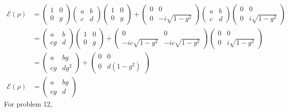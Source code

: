 \begin{align}
    \mathcal{E}(\rho) &= \begin{pmatrix}1 & 0 \\ 0 & g\end{pmatrix} \begin{pmatrix}a & b \\ c & d \end{pmatrix}\begin{pmatrix}1 & 0 \\ 0 & g\end{pmatrix} + \begin{pmatrix}0 & 0 \\ 0 & -i\sqrt{1-g^2}\end{pmatrix} \begin{pmatrix}a & b \\ c & d \end{pmatrix}\begin{pmatrix}0 & 0 \\ 0 & i\sqrt{1-g^2}\end{pmatrix} \\ 
    &= \begin{pmatrix}a & b \\ cg & d \end{pmatrix}\begin{pmatrix}1 & 0 \\ 0 & g\end{pmatrix} +  \begin{pmatrix}0 & 0 \\ -ic\sqrt{1-g^2} & -ic\sqrt{1-g^2}\end{pmatrix}\begin{pmatrix}0 & 0 \\ 0 & i\sqrt{1-g^2}\end{pmatrix}\\
    &= \begin{pmatrix}a & bg \\ cg & dg^2 \end{pmatrix} + \begin{pmatrix}0 & 0 \\ 0 & d(1-g^2) \end{pmatrix} \\
    \mathcal{E}(\rho) &= \begin{pmatrix}a & bg \\ cg & d \end{pmatrix}
\end{align}
For problem 12,
